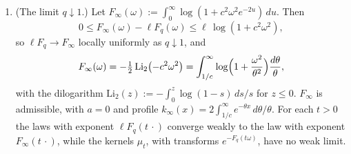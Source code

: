\begin{theorem}
\begin{enumerate}
$L_{ct}$ is one forward and one backward first-order pass
(Proposition~\ref{prop:recursion-helmholtz}(1)).
\item (The limit $q \downarrow 1$.) Let
$F_\infty(\omega) := \int_0^\infty\log(1 + c^2\omega^2e^{-2u})\,du$. Then
\[
  0 \le F_\infty(\omega) - \ell F_q(\omega) \le \ell\,\log(1 + c^2\omega^2),
\]
so $\ell F_q \to F_\infty$ locally uniformly as $q \downarrow 1$, and
\begin{equation}\label{eq:line-e8}
  F_\infty(\omega) = -\tfrac12\,\mathrm{Li}_2\bigl(-c^2\omega^2\bigr)
  = \int_{1/c}^\infty\log\Bigl(1 + \frac{\omega^2}{\theta^2}\Bigr)\frac{d\theta}{\theta},
\end{equation}
with the dilogarithm $\mathrm{Li}_2(z) := -\int_0^z\log(1 - s)\,ds/s$ for $z \le 0$.
$F_\infty$ is admissible, with $a = 0$ and profile $k_\infty(x) = 2\int_{1/c}^\infty e^{-\theta x}\,d\theta/\theta$.
For each $t > 0$ the laws with exponent $\ell F_q(t\,\cdot)$ converge weakly to the law with exponent
$F_\infty(t\,\cdot)$, while the kernels $\mu_t$, with transforms $e^{-F_q(t\omega)}$, have no weak
limit.
\end{enumerate}
\end{theorem}

